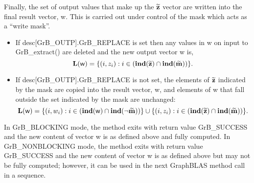 Finally, the set of output values that make up the ${\bf \widetilde{z}}$ 
vector are written into the final result vector, {\sf w}. 
This is carried out under control of the mask which acts as a ``write mask''.
\begin{itemize}
\item If {\sf desc[GrB\_OUTP].GrB\_REPLACE} is set then any values in {\sf w} 
on input to {\sf GrB\_extract()} are deleted and the new output vector {\sf w} is,
\[ \bold{L}({\sf w}) = \{(i,z_{i}) : i \in (\bold{ind}({\bf \widetilde{z}}) 
\cap \bold{ind}({\bf \widetilde{m}})) \}. \]

\item If {\sf desc[GrB\_OUTP].GrB\_REPLACE} is not set, the elements of 
${\bf \widetilde{z}}$ indicated by 
the mask are copied into the result vector, {\sf w}, and elements of 
{\sf w} that fall outside the set indicated by the mask are unchanged:
\[ \bold{L}({\sf w}) = \{(i,w_{i}) : i \in (\bold{ind}({\sf w}) 
\cap \bold{ind}(\neg {\bf \widetilde{m}})) \} \cup \{(i,z_{i}) : i \in 
(\bold{ind}({\bf \widetilde{z}}) \cap \bold{ind}({\bf \widetilde{m}})) \}. \]
\end{itemize}

In {\sf GrB\_BLOCKING} mode, the method exits with return value 
{\sf GrB\_SUCCESS} and the new content of vector {\sf w} is as defined above
and fully computed.  
In {\sf GrB\_NONBLOCKING} mode, the method exits with return value 
{\sf GrB\_SUCCESS} and the new content of vector {\sf w} is as defined above 
but may not be fully computed; however, it can be used in the next GraphBLAS 
method call in a sequence.



